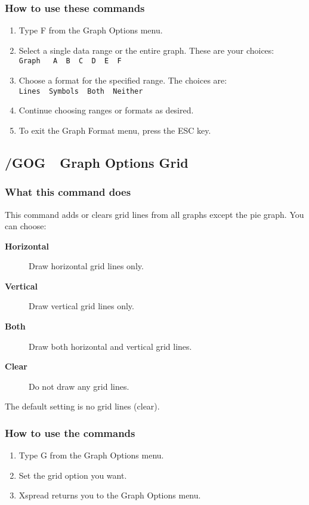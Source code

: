 \subsubsection*{How to use these commands}
\begin{enumerate}
\item{Type F from the Graph Options menu.}
\item{Select a single data range or the entire graph.  These are your
        choices:\\
        {\tt Graph \ \ A\ \  B\ \  C\ \  D\ \  E\ \  F}  }
\item{Choose a format for the specified range.  The choices are:\\
        {\tt Lines\ \  Symbols\ \  Both\ \  Neither} }
\item{Continue choosing ranges or formats as desired.}
\item{To exit the Graph Format menu, press the ESC key.}
\end{enumerate}

\subsection*{/GOG\ \     Graph Options Grid}

\subsubsection*{What this command does}
This command adds or clears grid lines from all graphs except the pie 
graph.  You can choose:

\begin{description}
\item[{\bf Horizontal  }]{Draw horizontal grid lines only.}
\item[{\bf Vertical    }]{Draw vertical grid lines only.}
\item[{\bf Both        }]{Draw both horizontal and vertical grid lines.}
\item[{\bf Clear       }]{Do not draw any grid lines.}
\end{description}

The default setting is no grid lines (clear).

\subsubsection*{How to use the commands}
\begin{enumerate}
\item{Type G from the Graph Options menu.}
\item{Set the grid option you want.}
\item{Xspread returns you to the Graph Options menu.}
\end{enumerate}


